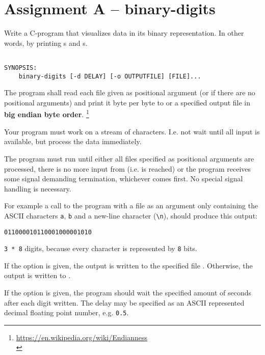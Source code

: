 




\section*{Assignment A -- binary-digits}

Write a C-program that visualizes data in its binary representation.
In other words, by printing s and s.

\begin{verbatim}

SYNOPSIS:
	binary-digits [-d DELAY] [-o OUTPUTFILE] [FILE]...

\end{verbatim}


The program shall read each file given as positional argument
(or  if there are no positional arguments)
and print it byte per byte to  or a specified output file in \textbf{big endian byte order}.
\footnote{
	\url{https://en.wikipedia.org/wiki/Endianness}\\
}

Your program must work on a stream of characters.
I.e. not wait until all input is available, but process
the data immediately.

The program must run until either all files specified as
positional arguments are processed, there is no more input
from  (i.e.  is reached)
or the program receives some signal demanding termination,
whichever comes first.
No special signal handling is necessary.

For example a call to the program with a file as an argument
only containing the ASCII characters \verb|a|, \verb|b|
and a new-line character (\verb|\n|), should produce this
output:

\verb|011000010110001000001010|

\verb|3 * 8| digits, because every character is represented
by \verb|8| bits.

If the option  is given,
the output is written to the specified file .
Otherwise, the output is written to .

If the option  is given,
the program should wait the specified amount of seconds after each
digit written.
The delay may be specified as an ASCII represented decimal floating point number, e.g. \verb|0.5|.

